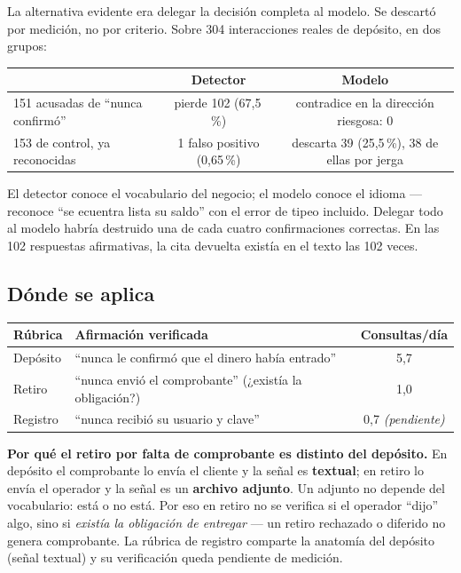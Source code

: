 \documentclass[11pt,a4paper]{article}
\begin{document}
La alternativa evidente era delegar la decisión completa al modelo. Se descartó por medición,
no por criterio. Sobre 304 interacciones reales de depósito, en dos grupos:

\begin{center}
\begin{tabularx}{\textwidth}{@{}Xcc@{}}
\toprule
& \textbf{Detector} & \textbf{Modelo} \\
\midrule
151 acusadas de ``nunca confirmó'' & pierde 102 (67,5\,\%) & contradice en la dirección
riesgosa: 0 \\
153 de control, ya reconocidas & 1 falso positivo (0,65\,\%) & descarta 39 (25,5\,\%),
38 de ellas por jerga \\
\bottomrule
\end{tabularx}
\end{center}

El detector conoce el vocabulario del negocio; el modelo conoce el idioma --- reconoce
``se ecuentra lista su saldo'' con el error de tipeo incluido. Delegar todo al modelo
habría destruido una de cada cuatro confirmaciones correctas. En las 102 respuestas
afirmativas, la cita devuelta existía en el texto las 102 veces.

\subsection{Dónde se aplica}

\begin{center}
\begin{tabularx}{\textwidth}{@{}lXc@{}}
\toprule
\textbf{Rúbrica} & \textbf{Afirmación verificada} & \textbf{Consultas/día} \\
\midrule
Depósito & ``nunca le confirmó que el dinero había entrado'' & 5,7 \\
Retiro   & ``nunca envió el comprobante'' (¿existía la obligación?) & 1,0 \\
Registro & ``nunca recibió su usuario y clave'' & 0,7 \emph{(pendiente)} \\
\bottomrule
\end{tabularx}
\end{center}

\begin{nota}
\textbf{Por qué el retiro por falta de comprobante es distinto del depósito.} En depósito el
comprobante lo envía el cliente y la señal es \textbf{textual}; en retiro lo envía el
operador y la señal es un \textbf{archivo adjunto}. Un adjunto no depende del vocabulario:
está o no está. Por eso en retiro no se verifica si el operador ``dijo'' algo, sino si
\emph{existía la obligación de entregar} --- un retiro rechazado o diferido no genera
comprobante. La rúbrica de registro comparte la anatomía del depósito (señal textual) y su
verificación queda pendiente de medición.
\end{nota}
\end{document}
